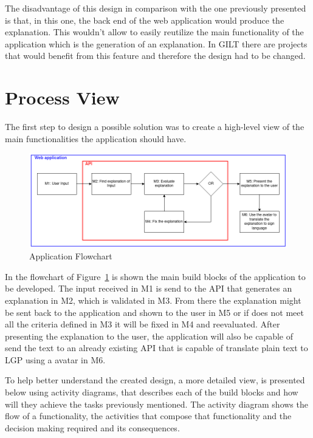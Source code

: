 The disadvantage of this design in comparison with the one previously presented is that, in this one, the back end of the web application would produce the explanation.
This wouldn't allow to easily reutilize the main functionality of the application which is the generation of an explanation.
In GILT there are projects that would benefit from this feature and therefore the design had to be changed.

\section{Process View}

The first step to design a possible solution was to create a high-level view of the main functionalities the application should have.

\begin{figure}[H]
\centering
\includegraphics[width=\textwidth,keepaspectratio]{ch4/assets/diagram1_2.png}
\caption[Application Flowchart]{Application Flowchart}
\label{fig:Diagram1}
\end{figure}

In the flowchart of Figure~\ref{fig:Diagram1} is shown the main build blocks of the application to be developed.
The input received in M1 is send to the \gls{API} that generates an explanation in M2, which is validated in M3.
From there the explanation might be sent back to the application and shown to the user in M5  or if does not meet all the criteria defined in M3 it will be fixed in M4 and reevaluated.
After presenting the explanation to the user, the application will also be capable of send the text to an already existing \gls{API} that is capable of translate plain text to \gls{LGP} using a avatar in M6.

To help better understand the created design, a more detailed view, is presented below using activity diagrams, that describes each of the build blocks and how will they achieve the tasks previously mentioned.
The activity diagram shows the flow of a functionality, the activities that compose that functionality and the decision making required and its consequences.

